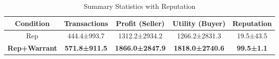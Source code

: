 \begin{table}[t]
    \centering
    \caption{Summary Statistics with Reputation}
    \label{tab:rq1_summary_stats}
    \begin{tabular}{ccccc}
    \toprule
    \textbf{Condition} & \textbf{Transactions} & \textbf{Profit (Seller)} & \textbf{Utility (Buyer)} & \textbf{Reputation} \\
    \midrule
    Rep & 444.4±993.7 & 1312.2±2934.2 & 1266.2±2831.3 & 19.5±43.5 \\
    \textbf{Rep+Warrant} & \textbf{571.8±911.5} & \textbf{1866.0±2847.9} & \textbf{1818.0±2740.6} & \textbf{99.5±1.1} \\
    \bottomrule
    \end{tabular}
\end{table}